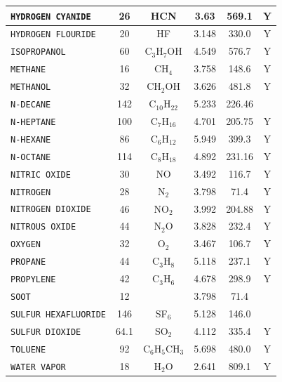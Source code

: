 \documentclass[11pt]{book}
\newcommand{\ct}{\tt\small}
\begin{document}
\begin{table}[ht]
\begin{center}
\begin{tabular}{|l|c|c|c|c|c|}
{\ct HYDROGEN CYANIDE}   & 26   & HCN              & 3.63     & 569.1           &    Y   \\ \hline
{\ct HYDROGEN FLOURIDE}  & 20   & HF               & 3.148    & 330.0           &    Y   \\ \hline
{\ct ISOPROPANOL}        & 60   & C$_3$H$_7$OH     & 4.549    & 576.7           &    Y   \\ \hline
{\ct METHANE}            & 16   & CH$_4$           & 3.758    & 148.6           &    Y   \\ \hline
{\ct METHANOL}           & 32   & CH$_2$OH         & 3.626    & 481.8           &    Y   \\ \hline
{\ct N-DECANE}           & 142  & C$_{10}$H$_{22}$ & 5.233    & 226.46          &        \\ \hline
{\ct N-HEPTANE}          & 100  & C$_7$H$_{16}$    & 4.701    & 205.75          &    Y   \\ \hline
{\ct N-HEXANE}           & 86   & C$_6$H$_{12}$    & 5.949    & 399.3           &    Y   \\ \hline
{\ct N-OCTANE}           & 114  & C$_8$H$_{18}$    & 4.892    & 231.16          &    Y   \\ \hline
{\ct NITRIC OXIDE}       & 30   & NO               & 3.492    & 116.7           &    Y   \\ \hline
{\ct NITROGEN}           & 28   & N$_2$            & 3.798    & 71.4            &    Y   \\ \hline
{\ct NITROGEN DIOXIDE}   & 46   & NO$_2$           & 3.992    & 204.88          &    Y   \\ \hline
{\ct NITROUS OXIDE}      & 44   & N$_2$O           & 3.828    & 232.4           &    Y   \\ \hline
{\ct OXYGEN}             & 32   & O$_2$            & 3.467    & 106.7           &    Y   \\ \hline
{\ct PROPANE}            & 44   & C$_3$H$_8$       & 5.118    & 237.1           &    Y   \\ \hline
{\ct PROPYLENE}          & 42   & C$_3$H$_6$       & 4.678    & 298.9           &    Y   \\ \hline
{\ct SOOT}               & 12   &                  & 3.798    & 71.4            &        \\ \hline
{\ct SULFUR HEXAFLUORIDE}& 146  & SF$_6$           & 5.128    & 146.0           &        \\ \hline
{\ct SULFUR DIOXIDE}     & 64.1 & SO$_2$           & 4.112    & 335.4           &    Y   \\ \hline
{\ct TOLUENE}            & 92   & C$_6$H$_5$CH$_3$ & 5.698    & 480.0           &    Y   \\ \hline
{\ct WATER VAPOR}        & 18   & H$_2$O           & 2.641    & 809.1           &    Y   \\ \hline
\end{tabular}
\end{center}
\end{table}
\end{document}
